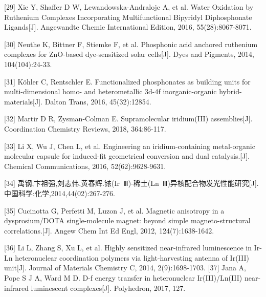 \documentclass[UTF8,a4paper,10pt,twocolumn]{ctexart}
\begin{document}
\noindent{}[29] Xie Y, Shaffer D W, Lewandowska-Andralojc A, et al. Water Oxidation by Ruthenium Complexes Incorporating Multifunctional Bipyridyl Diphosphonate Ligands[J]. Angewandte Chemie International Edition, 2016, 55(28):8067-8071.

\noindent{}[30] Neuthe K, Bittner F, Stiemke F, et al. Phosphonic acid anchored ruthenium complexes for ZnO-based dye-sensitized solar cells[J]. Dyes and Pigments, 2014, 104(104):24-33.

\noindent{}[31] Köhler C, Rentschler E. Functionalized phosphonates as building units for multi-dimensional homo- and heterometallic 3d-4f inorganic-organic hybrid-materials[J]. Dalton Trans, 2016, 45(32):12854.

\noindent{}[32] Martir D R, Zysman-Colman E. Supramolecular iridium(III) assemblies[J]. Coordination Chemistry Reviews, 2018, 364:86-117.

\noindent{}[33] Li X, Wu J, Chen L, et al. Engineering an iridium-containing metal-organic molecular capsule for induced-fit geometrical conversion and dual catalysis.[J]. Chemical Communications, 2016, 52(62):9628-9631.

\noindent{}[34] 禹钢,卞祖强,刘志伟,黄春辉.铱(Ir~Ⅲ)-稀土(Ln~Ⅲ)异核配合物发光性能研究[J].中国科学:化学,2014,44(02):267-276.

\noindent{}[35] Cucinotta G, Perfetti M, Luzon J, et al. Magnetic anisotropy in a dysprosium/DOTA single-molecule magnet: beyond simple magneto-structural correlations.[J]. Angew Chem Int Ed Engl, 2012, 124(7):1638-1642.

\noindent{}[36] Li L, Zhang S, Xu L, et al. Highly sensitized near-infrared luminescence in Ir-Ln heteronuclear coordination polymers via light-harvesting antenna of Ir(III) unit[J]. Journal of Materials Chemistry C, 2014, 2(9):1698-1703.
\newpage
\noindent{}[37] Jana A, Pope S J A, Ward M D. D-f energy transfer in heteronuclear Ir(III)/Ln(III) near-infrared luminescent complexes[J]. Polyhedron, 2017, 127.
\end{document}
